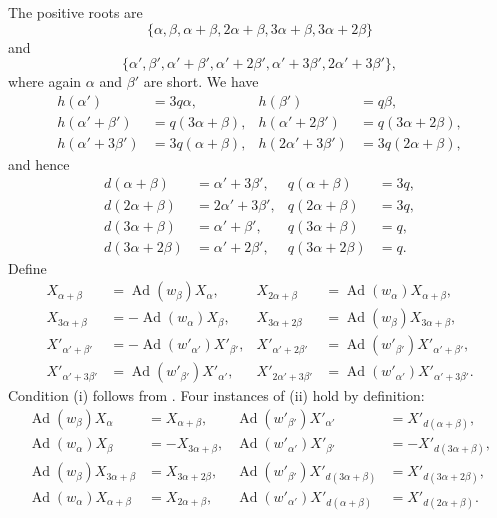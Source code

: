 The positive roots are
\[
\{\alpha,\beta,\alpha+\beta,2\alpha+\beta,3\alpha+\beta,
  3\alpha+2\beta\}
\]
and
\[
\{\alpha',\beta',\alpha'+\beta',\alpha'+2\beta',
  \alpha'+3\beta',2\alpha'+3\beta'\},
\]
where again \(\alpha\) and \(\beta'\) are short. We have
\[
\begin{aligned}
 h(\alpha')&=3q\alpha,&h(\beta')&=q\beta,\\
 h(\alpha'+\beta')&=q(3\alpha+\beta),&
 h(\alpha'+2\beta')&=q(3\alpha+2\beta),\\
 h(\alpha'+3\beta')&=3q(\alpha+\beta),&
 h(2\alpha'+3\beta')&=3q(2\alpha+\beta),
\end{aligned}
\]
and hence
\[
\begin{aligned}
 d(\alpha+\beta)&=\alpha'+3\beta',&q(\alpha+\beta)&=3q,\\
 d(2\alpha+\beta)&=2\alpha'+3\beta',&q(2\alpha+\beta)&=3q,\\
 d(3\alpha+\beta)&=\alpha'+\beta',&q(3\alpha+\beta)&=q,\\
 d(3\alpha+2\beta)&=\alpha'+2\beta',&q(3\alpha+2\beta)&=q.
\end{aligned}
\]
Define
\[
\begin{aligned}
 X_{\alpha+\beta}&=\operatorname{Ad}(w_\beta)X_\alpha,&
 X_{2\alpha+\beta}&=\operatorname{Ad}(w_\alpha)X_{\alpha+\beta},\\
 X_{3\alpha+\beta}&=-\operatorname{Ad}(w_\alpha)X_\beta,&
 X_{3\alpha+2\beta}&=\operatorname{Ad}(w_\beta)X_{3\alpha+\beta},\\
 X'_{\alpha'+\beta'}&=-\operatorname{Ad}(w'_{\alpha'})X'_{\beta'},&
 X'_{\alpha'+2\beta'}&=\operatorname{Ad}(w'_{\beta'})X'_{\alpha'+\beta'},\\
 X'_{\alpha'+3\beta'}&=\operatorname{Ad}(w'_{\beta'})X'_{\alpha'},&
 X'_{2\alpha'+3\beta'}&=\operatorname{Ad}(w'_{\alpha'})X'_{\alpha'+3\beta'}.
\end{aligned}
\]
Condition (i) follows from . Four instances of
(ii) hold by definition:
\[
\begin{aligned}
 \operatorname{Ad}(w_\beta)X_\alpha&=X_{\alpha+\beta},&
 \operatorname{Ad}(w'_{\beta'})X'_{\alpha'}&=X'_{d(\alpha+\beta)},\\
 \operatorname{Ad}(w_\alpha)X_\beta&=-X_{3\alpha+\beta},&
 \operatorname{Ad}(w'_{\alpha'})X'_{\beta'}&=-X'_{d(3\alpha+\beta)},\\
 \operatorname{Ad}(w_\beta)X_{3\alpha+\beta}&=X_{3\alpha+2\beta},&
 \operatorname{Ad}(w'_{\beta'})X'_{d(3\alpha+\beta)}
   &=X'_{d(3\alpha+2\beta)},\\
 \operatorname{Ad}(w_\alpha)X_{\alpha+\beta}&=X_{2\alpha+\beta},&
 \operatorname{Ad}(w'_{\alpha'})X'_{d(\alpha+\beta)}
   &=X'_{d(2\alpha+\beta)}.
\end{aligned}
\]
